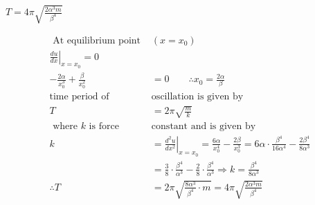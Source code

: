 \begin{enumerate}
	$T=4 \pi \sqrt{\frac{2 \alpha^{3} m}{\beta^{4}}}$
	\begin{answer}
		\begin{align*}
	\text{	At equilibrium point }&\left(x=x_{0}\right)\\
		\left.\frac{d u}{d x}\right|_{x=x_{0}}=0 \\
		-\frac{2 \alpha}{x_{0}^{3}}+\frac{\beta}{x_{0}^{2}}&=0\quad 
		\quad\therefore x_{0}=\frac{2 \alpha}{\beta}\\
		 \text{time period of }&\text{oscillation is given by}\\
		T&=2 \pi \sqrt{\frac{m}{k}}\\
	\text{	where $k$ is force }&\text{constant and is given by}\\
		k&=\left.\frac{d^{2} u}{d x^{2}}\right|_{x=x_{0}} =\frac{6 \alpha}{x_{0}^{4}}-\frac{2 \beta}{x_{0}^{3}}=6 \alpha \cdot \frac{\beta^{4}}{16 \alpha^{4}}-\frac{2 \beta^{4}}{8 \alpha^{3}} \\
		&=\frac{3}{8} \cdot \frac{\beta^{4}}{\alpha^{3}}-\frac{2}{8} \cdot \frac{\beta^{4}}{\alpha^{3}} \Rightarrow k=\frac{\beta^{4}}{8 \alpha^{3}}\\
		\therefore T&=2 \pi \sqrt{\frac{8 \alpha^{3}}{\beta^{4}} \cdot m}=4 \pi \sqrt{\frac{2 \alpha^{3} m}{\beta^{4}}}
		\end{align*}
	\end{answer}
\end{enumerate}
